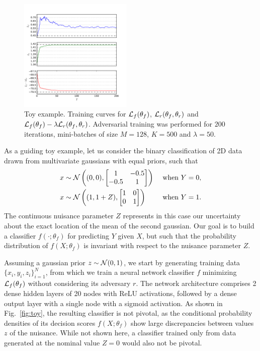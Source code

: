 \documentclass[twocolumn,superscriptaddress,aps]{revtex4-1}
\theoremstyle{plain}
\begin{document}
\begin{figure}
    \includegraphics[width=0.48\textwidth]{figures/training.pdf}
    \vspace{-1cm}
    \caption{Toy example. Training curves for ${\cal L}_f(\theta_f)$, ${\cal L}_r(\theta_f, \theta_r)$
             and ${\cal L}_f(\theta_f) - \lambda {\cal L}_r(\theta_f, \theta_r)$.
             Adversarial training was performed for $200$ iterations, mini-batches of size $M=128$, $K=500$ and $\lambda=50$.}
    \label{fig:toy-training}
\end{figure}

As a guiding toy example, let us consider the binary classification of 2D
data drawn from multivariate gaussians with equal priors, such that
\begin{align}
    x &\sim {\cal N}\left ((0,0), \begin{bmatrix}
                              1 & -0.5 \\
                              -0.5 & 1
                            \end{bmatrix}\right) &\text{ when } Y=0, \\
    x &\sim {\cal N}\left ((1,1+Z),  \begin{bmatrix}
                              1 & 0 \\
                              0 & 1
                             \end{bmatrix}\right) &\text{ when } Y=1.
\end{align}
The continuous nuisance parameter $Z$ represents in this case our
uncertainty about the exact location of the mean of the second gaussian. Our goal is to
build a classifier $f(\cdot;\theta_f)$ for predicting $Y$ given $X$, but such that
the probability distribution of $f(X;\theta_f)$ is invariant with respect to the
nuisance parameter $Z$.

Assuming a gaussian prior $z \sim {\cal N}(0,1)$, we start by
generating training data $\{ x_i, y_i, z_i \}_{i=1}^N$, from which we train a
neural network classifier $f$ minimizing ${\cal L}_f(\theta_f)$ without
considering its adversary $r$. The network architecture comprises 2 dense hidden layers of 20
nodes with ReLU activations, followed  by a dense output layer with a single
node with a sigmoid activation. As shown in
Fig.~\ref{fig:toy}, the resulting classifier is not pivotal, as the
conditional probability densities of its decision scores $f(X;\theta_f)$ show
large discrepancies between values $z$ of the nuisance. While not shown here, a
classifier trained only from data generated at the nominal value $Z=0$ would
also not be pivotal.
\end{document}
